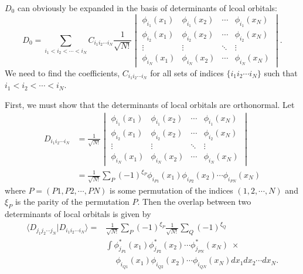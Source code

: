 \documentclass{article}
\newcommand{\bra}{\langle}
\newcommand{\ket}{\rangle}
\begin{document}
$D_0$ can obviously be expanded in the basis of determinants of lcoal orbitals:
\begin{displaymath}
D_0 = \sum_{i_1<i_2<\cdots<i_N} C_{i_1i_2\cdots i_N} \frac{1}{\sqrt{N!}}
\begin{vmatrix}
\phi_{i_1}(x_1) & \phi_{i_1}(x_2) & \cdots & \phi_{i_1}(x_N) \\
\phi_{i_2}(x_1) & \phi_{i_2}(x_2) & \cdots & \phi_{i_2}(x_N) \\
\vdots      & \vdots      & \ddots & \vdots      \\
\phi_{i_N}(x_1) & \phi_{i_N}(x_2) & \cdots & \phi_{i_N}(x_N)
\end{vmatrix}.
\end{displaymath}
We need to find the coefficients, $C_{i_1i_2\cdots i_N}$ for all sets
of indices $\{i_1i_2\cdots i_N\}$ such that $i_1<i_2<\cdots<i_N$.

First, we must show that the determinants of local orbitals are orthonormal.  Let
\begin{align*}
D_{i_1i_2\cdots i_N} &= \frac{1}{\sqrt{N!}}
\begin{vmatrix}
\phi_{i_1}(x_1) & \phi_{i_1}(x_2) & \cdots & \phi_{i_1}(x_N) \\
\phi_{i_2}(x_1) & \phi_{i_2}(x_2) & \cdots & \phi_{i_2}(x_N) \\
\vdots      & \vdots      & \ddots & \vdots      \\
\phi_{i_N}(x_1) & \phi_{i_N}(x_2) & \cdots & \phi_{i_N}(x_N)
\end{vmatrix} \\
&= \frac{1}{\sqrt{N!}} \sum_P (-1)^{\xi_P} \phi_{i_{P1}}(x_1) \phi_{i_{P2}}(x_2) \cdots \phi_{i_{PN}}(x_N)
\end{align*}
where $P=(P1,P2,\cdots,PN)$ is some permutation of the indices $(1,2,\cdots,N)$ and $\xi_P$ is the parity of the permutation $P$.  Then the overlap between two determinants of local orbitals is given by
\begin{displaymath}
\begin{split}
\bra D_{j_1j_2\cdots j_N} | D_{i_1i_2\cdots i_N} \ket = &
\frac{1}{\sqrt{N!}} \sum_P (-1)^{\xi_P}
\frac{1}{\sqrt{N!}} \sum_Q (-1)^{\xi_Q} \\
&\int
\phi_{j_{P1}}^*(x_1) \phi_{j_{P2}}^*(x_2) \cdots \phi_{j_{PN}}^*(x_N)
\; \times \\
&\quad\ \phi_{i_{Q1}}(x_1) \phi_{i_{Q2}}(x_2) \cdots \phi_{i_{QN}}(x_N)
dx_1 dx_2 \cdots dx_N.
\end{split}
\end{displaymath}
\end{document}
